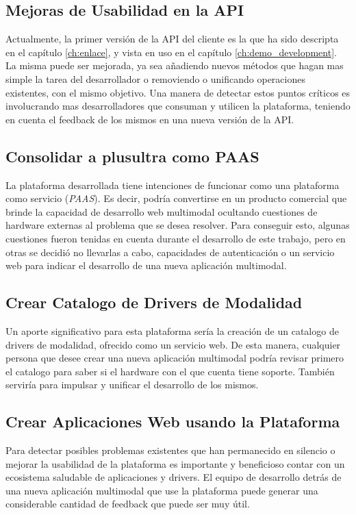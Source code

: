 \subsection{Mejoras de Usabilidad en la API}
Actualmente, la primer versión de la API del cliente es la que ha sido descripta en el capítulo \ref{ch:enlace}, y vista en uso en el capítulo \ref{ch:demo_development}. La misma puede ser mejorada, ya sea añadiendo nuevos métodos que hagan mas simple la tarea del desarrollador o removiendo o unificando operaciones existentes, con el mismo objetivo. Una manera de detectar estos puntos críticos es involucrando mas desarrolladores que consuman y utilicen la plataforma, teniendo en cuenta el feedback de los mismos en una nueva versión de la API.

\subsection{Consolidar a plusultra como PAAS}
La plataforma desarrollada tiene intenciones de funcionar como una plataforma como servicio (\emph{PAAS}). Es decir, podría convertirse en un producto comercial que brinde la capacidad de desarrollo web multimodal ocultando cuestiones de hardware externas al problema que se desea resolver. Para conseguir esto, algunas cuestiones fueron tenidas en cuenta durante el desarrollo de este trabajo, pero en otras se decidió no llevarlas a cabo, \eg capacidades de autenticación o un servicio web para indicar el desarrollo de una nueva aplicación multimodal.

\subsection{Crear Catalogo de Drivers de Modalidad}
Un aporte significativo para esta plataforma sería la creación de un catalogo de drivers de modalidad, ofrecido como un servicio web. De esta manera, cualquier persona que desee crear una nueva aplicación multimodal podría revisar primero el catalogo para saber si el hardware con el que cuenta tiene soporte. También serviría para impulsar y unificar el desarrollo de los mismos.

\subsection{Crear Aplicaciones Web usando la Plataforma}
Para detectar posibles problemas existentes que han permanecido en silencio o mejorar la usabilidad de la plataforma es importante y beneficioso contar con un ecosistema saludable de aplicaciones y drivers. El equipo de desarrollo detrás de una nueva aplicación multimodal que use la plataforma puede generar una considerable cantidad de feedback que puede ser muy útil.

